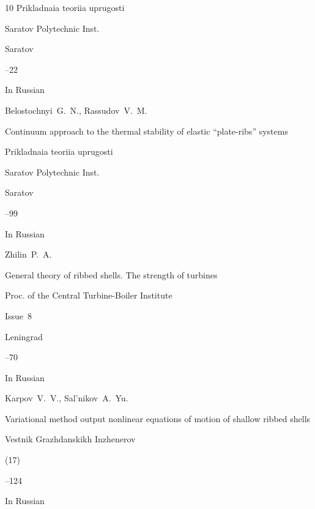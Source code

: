 \begin{thebibliography}{10}
\inbook Prikladnaia teoriia uprugosti

\publ Saratov Polytechnic Inst.

\publaddr Saratov 

 --22



  


\lang In Russian

\by Belostochnyi~G.~N., Rassudov~V.~M.

\paper Continuum approach to the thermal stability of elastic ``plate-ribs'' systems

\inbook Prikladnaia teoriia uprugosti

\publ Saratov Polytechnic Inst.

\publaddr Saratov 


--99








\lang In Russian

\by Zhilin~P.~A.

\paper General theory of ribbed shells. The strength of turbines

\inbook  Proc. of the Central Turbine-Boiler Institute


\volinfo Issue~8

\publaddr Leningrad

--70








\lang In Russian

\by Karpov~V.~V., Sal'nikov~A.~Yu.

\paper Variational method output nonlinear equations of motion of shallow ribbed shells

\jour Vestnik Grazhdanskikh Inzhenerov


(17)

--124






\lang In Russian


\end{thebibliography}
